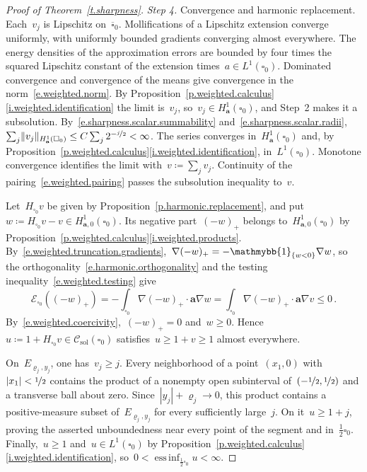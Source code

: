 \documentclass[11pt,letterpaper]{article}
\numberwithin{equation}{section}
\theoremstyle{definition}
\renewcommand{\a}{\mathbf{a}}
\newcommand{\nf}{\nicefrac}
\newcommand{\cu}{\square}
\DeclareMathOperator*{\essinf}{ess\,inf}
\DeclarePairedDelimiter{\norm}{\lVert}{\rVert}
\newcommand{\indc}{{\mathmybb{1}}}
\newcommand{\Ener}{\mathcal E}
\newcommand{\Hzero}[1]{H^1_{#1,0}}
\newcommand{\Csol}{\mathcal C_{\mathrm{sol}}}
\begin{document}
\begin{proof}[Proof of Theorem~\ref{t.sharpness}]
\smallskip
\emph{Step 4.} Convergence and harmonic replacement. Each~$v_j$ is Lipschitz on~$\overline{\cu}_0$. Mollifications of a Lipschitz extension converge uniformly, with uniformly bounded gradients converging almost everywhere. The energy densities of the approximation errors are bounded by four times the squared Lipschitz constant of the extension times~$a\in L^1(\cu_0)$. Dominated convergence and convergence of the means give convergence in the norm~\eqref{e.weighted.norm}. By Proposition~\ref{p.weighted.calculus}\ref{i.weighted.identification} the limit is~$v_j$, so~$v_j\in H^1_\a(\cu_0)$, and Step~2 makes it a subsolution. By~\eqref{e.sharpness.scalar.summability} and~\eqref{e.sharpness.scalar.radii},~$\sum_j\norm{v_j}_{H^1_\a(\cu_0)}\leq C\sum_j2^{-\nf j2}<\infty$. The series converges in~$H^1_\a(\cu_0)$ and, by Proposition~\ref{p.weighted.calculus}\ref{i.weighted.identification}, in~$L^1(\cu_0)$. Monotone convergence identifies the limit with~$v\coloneqq\sum_jv_j$. Continuity of the pairing~\eqref{e.weighted.pairing} passes the subsolution inequality to~$v$.

\smallskip
Let~$H_{\cu_0}v$ be given by Proposition~\ref{p.harmonic.replacement}, and put~$w\coloneqq H_{\cu_0}v-v\in\Hzero{\a}(\cu_0)$. Its negative part~$(-w)_+$ belongs to~$\Hzero{\a}(\cu_0)$ by Proposition~\ref{p.weighted.calculus}\ref{i.weighted.products}. By~\eqref{e.weighted.truncation.gradients},~$\nabla(-w)_+=-\indc_{\{w<0\}}\nabla w$, so the orthogonality~\eqref{e.harmonic.orthogonality} and the testing inequality~\eqref{e.weighted.testing} give
\begin{equation*}
	\Ener_{\cu_0}((-w)_+)=-\int_{\cu_0}\nabla(-w)_+\cdot\a\nabla w=\int_{\cu_0}\nabla(-w)_+\cdot\a\nabla v\leq0\,.
\end{equation*}
By~\eqref{e.weighted.coercivity},~$(-w)_+=0$ and~$w\geq0$. Hence~$u\coloneqq1+H_{\cu_0}v\in\Csol(\cu_0)$ satisfies~$u\geq1+v\geq1$ almost everywhere.

\smallskip
On~$E_{\varrho_j,y_j}$, one has~$v_j\geq j$. Every neighborhood of a point~$(x_1,0)$ with~$|x_1|<\nf12$ contains the product of a nonempty open subinterval of~$(-\nf12,\nf12)$ and a transverse ball about zero. Since~$|y_j|+\varrho_j\to0$, this product contains a positive-measure subset of~$E_{\varrho_j,y_j}$ for every sufficiently large~$j$. On it~$u\geq1+j$, proving the asserted unboundedness near every point of the segment and in~$\frac12\cu_0$. Finally,~$u\geq1$ and~$u\in L^1(\cu_0)$ by Proposition~\ref{p.weighted.calculus}\ref{i.weighted.identification}, so~$0<\essinf_{\frac12\cu_0}u<\infty$.
\end{proof}
\end{document}
